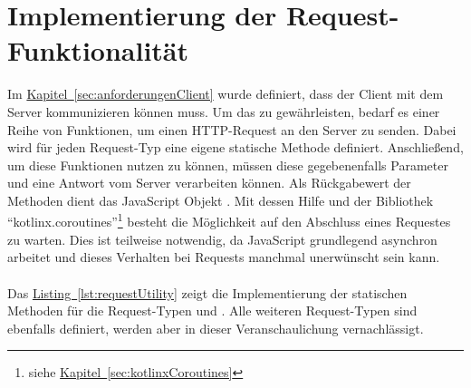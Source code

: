\section{Implementierung der Request-Funktionalität}\label{sec:requestFunctionality}
Im \hyperref[sec:anforderungenClient]{Kapitel~\ref{sec:anforderungenClient}} wurde definiert, dass der Client mit dem Server kommunizieren können muss. Um das zu gewährleisten, bedarf es einer Reihe von Funktionen, um einen \gls{HTTP}-Request an den Server zu senden. Dabei wird für jeden Request-Typ eine eigene statische Methode definiert. Anschließend, um diese Funktionen nutzen zu können, müssen diese gegebenenfalls Parameter und eine Antwort vom Server verarbeiten können. Als Rückgabewert der Methoden dient das JavaScript Objekt . Mit dessen Hilfe und der Bibliothek \enquote{kotlinx.coroutines}\footnote{siehe \hyperref[sec:kotlinxCoroutines]{Kapitel~\ref{sec:kotlinxCoroutines}}} besteht die Möglichkeit auf den Abschluss eines Requestes zu warten. Dies ist teilweise notwendig, da JavaScript grundlegend asynchron arbeitet und dieses Verhalten bei Requests manchmal unerwünscht sein kann.\\
\\
Das \hyperref[lst:requestUtility]{Listing~\ref{lst:requestUtility}} zeigt die Implementierung der statischen Methoden für die Request-Typen  und . Alle weiteren Request-Typen sind ebenfalls definiert, werden aber in dieser Veranschaulichung vernachlässigt.\\

